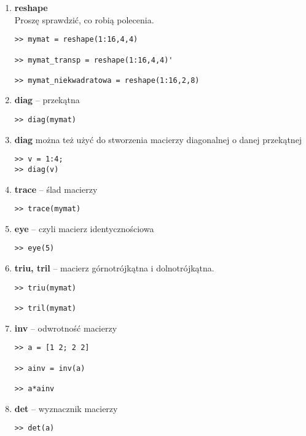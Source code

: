 \documentclass[12pt]{amsbook}
\theoremstyle{definition}
\begin{document}
\begin{enumerate}
\item \textbf{reshape}\\

Proszę sprawdzić, co robią polecenia.

\begin{lstlisting}
>> mymat = reshape(1:16,4,4)

>> mymat_transp = reshape(1:16,4,4)'

>> mymat_niekwadratowa = reshape(1:16,2,8)
\end{lstlisting}

\item \textbf{diag} -- przekątna\\

\begin{lstlisting}
>> diag(mymat)
\end{lstlisting}

\item \textbf{diag} można też użyć do stworzenia macierzy diagonalnej o danej przekątnej


\begin{lstlisting}
>> v = 1:4;
>> diag(v)
\end{lstlisting}

\item \textbf{trace} -- ślad macierzy

\begin{lstlisting}
>> trace(mymat)
\end{lstlisting}

\item \textbf{eye} -- czyli macierz identycznościowa

\begin{lstlisting}
>> eye(5)
\end{lstlisting}

\item \textbf{triu, tril} -- macierz górnotrójkątna i dolnotrójkątna.

\begin{lstlisting}
>> triu(mymat)

>> tril(mymat)
\end{lstlisting}

\item \textbf{inv} -- odwrotność macierzy

\begin{lstlisting}
>> a = [1 2; 2 2]

>> ainv = inv(a)

>> a*ainv
\end{lstlisting}

\item \textbf{det} -- wyznacznik macierzy

\begin{lstlisting}
>> det(a)
\end{lstlisting}


\end{enumerate}
\end{document}
